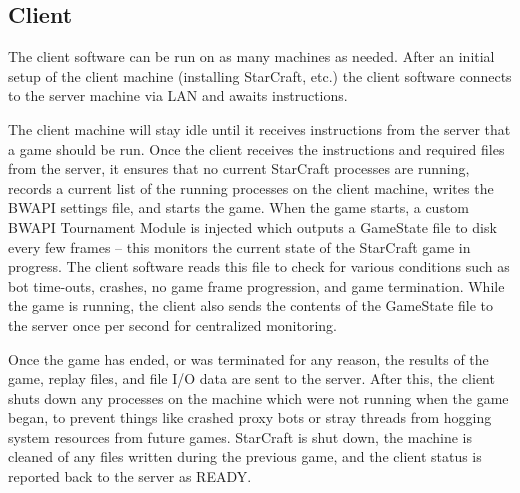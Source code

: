 \subsection{Client}

The client software can be run on as many machines as needed. After an initial setup of the client machine (installing StarCraft, etc.) the client software connects to the server machine via LAN and awaits instructions.

The client machine will stay idle until it receives instructions from the server that a game should be run. Once the client receives the instructions and required files from the server, it ensures that no current StarCraft processes are running, records a current list of the running processes on the client machine, writes the BWAPI settings file, and starts the game. When the game starts, a custom BWAPI Tournament Module is injected which outputs a GameState file to disk every few frames -- this monitors the current state of the StarCraft game in progress. The client software reads this file to check for various conditions such as bot time-outs, crashes, no game frame progression, and game termination. While the game is running, the client also sends the contents of the GameState file to the server once per second for centralized monitoring.

Once the game has ended, or was terminated for any reason, the results of the game, replay files, and file I/O data are sent to the server. After this, the client shuts down any processes on the machine which were not running when the game began, to prevent things like crashed proxy bots or stray threads from hogging system resources from future games. StarCraft is shut down, the machine is cleaned of any files written during the previous game, and the client status is reported back to the server as READY.




